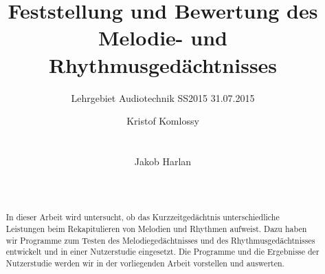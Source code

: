 \documentclass{acm_proc_article-sp}
\begin{document}
\title{Feststellung und Bewertung des Melodie- und Rhythmusgedächtnisses}
\subtitle{Lehrgebiet Audiotechnik SS2015 31.07.2015}

\author{
\alignauthor
Kristof Komlossy\\
       \\
       \\
\alignauthor
Jakob Harlan\\
       \\
       \\
} %

\maketitle

\begin{abstract}
In dieser Arbeit wird untersucht, ob das Kurzzeitgedächtnis unterschiedliche Leistungen beim Rekapitulieren von Melodien und Rhythmen aufweist. Dazu haben wir Programme zum Testen des Melodiegedächtnisses und des Rhythmusgedächtnisses entwickelt und in einer Nutzerstudie eingesetzt. Die Programme und die Ergebnisse der Nutzerstudie werden wir in der vorliegenden Arbeit vorstellen und auswerten.
\end{abstract}

\end{document}
